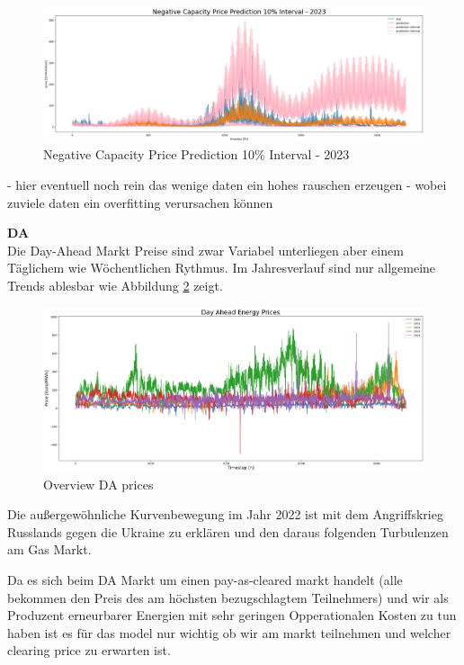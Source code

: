 \begin{figure}[H]
	\includegraphics[width=1\linewidth]{pictures/RL/Negative Capacity Price Prediction Interval - 2023.png}
	\caption{Negative Capacity Price Prediction 10\% Interval - 2023}
	\label{fig:Negative Capacity Price Prediction Interval - 2023}
\end{figure}

- hier eventuell noch rein das wenige daten ein hohes rauschen erzeugen
- wobei zuviele daten ein overfitting verursachen können



\textbf{DA}\\
Die Day-Ahead Markt Preise sind zwar Variabel unterliegen aber einem Täglichem wie Wöchentlichen Rythmus.
Im Jahresverlauf sind nur allgemeine Trends ablesbar wie Abbildung \ref{fig:overviewDAprices} zeigt.
\begin{figure}[!h]
	\includegraphics[width=1\linewidth]{pictures/overviewDAprices_year.png}
	\caption{Overview DA prices}
	\label{fig:overviewDAprices}
\end{figure}
Die außergewöhnliche Kurvenbewegung im Jahr 2022 ist mit dem Angriffskrieg Russlands gegen die Ukraine zu erklären
und den daraus folgenden Turbulenzen am Gas Markt.

Da es sich beim DA Markt um einen pay-as-cleared markt handelt (alle bekommen den Preis des am höchsten bezugschlagtem Teilnehmers)
und wir als Produzent erneurbarer Energien mit sehr geringen Opperationalen Kosten zu tun haben ist es für das model nur wichtig ob
wir am markt teilnehmen und welcher clearing price zu erwarten ist.

